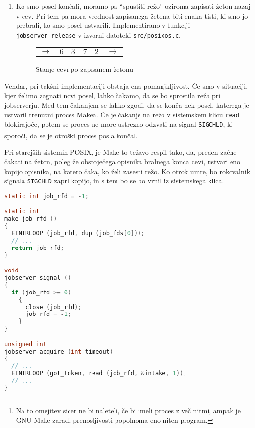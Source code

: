 \documentclass[notitlepage]{report}
\begin{document}
\begin{enumerate}
\item Ko smo posel končali, moramo pa ``spustiti režo'' oziroma
  zapisati žeton nazaj v cev. Pri tem pa mora vrednost zapisanega žetona biti
  enaka tisti, ki smo jo prebrali, ko smo posel ustvarili. Implementirano v funkciji
  \verb|jobserver_release| v izvorni datoteki \verb|src/posixos.c|.

    \begin{figure}[H]
    \begin{center}
      \begin{tabular}{ cc|c|c|cc }
        \cline{2-5}
        $\rightarrow$ & $6$ & $3$ & $7$ & $2$ & $\rightarrow$ \\
        \cline{2-5}
      \end{tabular}
      \end{center}
    \caption{Stanje cevi po zapisanem žetonu}
  \end{figure}
  
\end{enumerate}

Vendar, pri takšni implementaciji obstaja ena pomanjkljivost. Če smo v
situaciji, kjer želimo zagnati novi posel, lahko čakamo, da se bo
sprostila reža pri jobserverju. Med tem čakanjem se lahko zgodi, da se
konča nek posel, katerega je ustvaril trenutni proces Makea. Če je
čakanje na režo v sistemskem klicu \verb|read| blokirajoče, potem se
proces ne more ustrezno odzvati na signal \verb|SIGCHLD|, ki sporoči,
da se je otroški proces posla končal. \footnote{Na to omejitev sicer
  ne bi naleteli, če bi imeli proces z več nitmi, ampak je GNU Make
  zaradi prenosljivosti popolnoma eno-niten program.}

Pri starejših sistemih POSIX, je Make to težavo respil tako, da,
preden začne čakati na žeton, poleg že obstoječega opisnika bralnega
konca cevi, ustvari eno kopijo opisnika, na katero čaka, ko želi
zasesti režo. Ko otrok umre, bo rokovalnik signala \verb|SIGCHLD|
zaprl kopijo, in s tem bo se bo vrnil iz sistemskega klica.

\begin{lstlisting}[language=C, basicstyle=\sffamily]
static int job_rfd = -1;

static int
make_job_rfd ()
{
  EINTRLOOP (job_rfd, dup (job_fds[0]));
  // ...
  return job_rfd;
}

void
jobserver_signal ()
{
  if (job_rfd >= 0)
    {
      close (job_rfd);
      job_rfd = -1;
    }
}

unsigned int
jobserver_acquire (int timeout)
{
  // ...
  EINTRLOOP (got_token, read (job_rfd, &intake, 1));
  // ...
}
\end{lstlisting}
\end{document}
